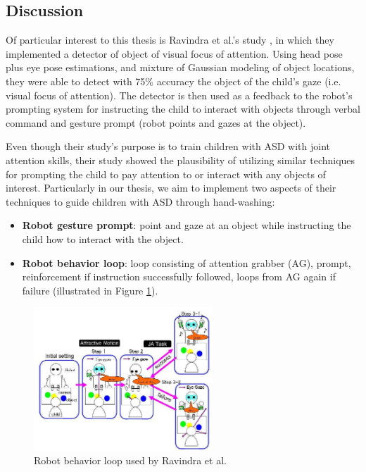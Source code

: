 \documentclass{ut-thesis}
\begin{document}
\subsection{Discussion}
Of particular interest to this thesis is Ravindra et al.'s study \cite{ravindra2009therapeutic}, in which they implemented a detector of object of visual focus of attention.  Using head pose plus eye pose estimations, and mixture of Gaussian modeling of object locations, they were able to detect with 75\% accuracy the object of the child's gaze (i.e. visual focus of attention).  The detector is then used as a feedback to the robot's prompting system for instructing the child to interact with objects through verbal command and gesture prompt (robot points and gazes at the object).


Even though their study's purpose is to train children with ASD with joint attention skills, their study showed the plausibility of utilizing similar techniques for prompting the child to pay attention to or interact with any objects of interest.  Particularly in our thesis, we aim to implement two aspects of their techniques to guide children with ASD through hand-washing:
\begin{itemize}
	\item \textbf{Robot gesture prompt}: point and gaze at an object while instructing the child how to interact with the object.
	\item \textbf{Robot behavior loop}: loop consisting of attention grabber (AG), prompt, reinforcement if instruction successfully followed, loops from AG again if failure (illustrated in Figure \ref{fig:ravindra2009therapeutic}).
\end{itemize}
\begin{figure} [h]
	\centering
	\includegraphics[width=0.6\textwidth]{./img/ravindra2009therapeutic.png}
	\caption{Robot behavior loop used by Ravindra et al. \cite{ravindra2009therapeutic}}
	\label{fig:ravindra2009therapeutic}
\end{figure}
\end{document}
